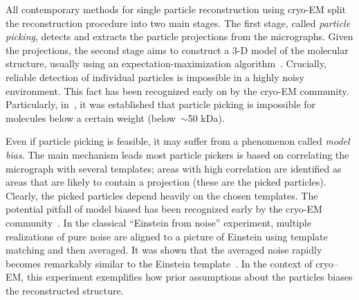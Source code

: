 \documentclass[12pt]{article}
\newcommand{\1}{\mathbf{1}}
\theoremstyle{plain}
\theoremstyle{definition}
\theoremstyle{remark}
\theoremstyle{plain}
\theoremstyle{remark}
\theoremstyle{plain}
\theoremstyle{plain}
\theoremstyle{plain}
\numberwithin{equation}{section}
\begin{document}
All contemporary methods for single particle reconstruction using cryo-EM  split the reconstruction procedure into two main  stages.
The first stage, called \emph{particle picking},  detects and extracts the particle projections from the micrographs. Given the projections, the second stage aims to construct a 3-D model of the molecular structure, usually using an expectation-maximization algorithm~\cite{scheres2012relion}. 
Crucially, reliable detection of individual particles is impossible in a highly noisy environment. This fact has been recognized early on by the cryo-EM community. 
Particularly, in~\cite{henderson1995limitations,glaeser1999electron}, it was established that particle picking is impossible for molecules below a certain weight (below~$\sim$50 kDa). 

Even if particle picking is feasible, it may suffer from a phenomenon called \emph{model bias}.
The main mechanism leads most particle pickers is based on correlating the micrograph with several templates; areas with high correlation are identified as areas that  are likely to contain a projection (these are the picked particles). 
Clearly, the picked particles depend heavily on the chosen templates.
The potential pitfall of model biased
has been recognized early by the cryo-EM community~\cite{shatsky2009method,vanheel1992correlation,henderson2013avoiding,vanheel2013finding}. In the classical ``Einstein from noise'' experiment, multiple realizations of pure noise are aligned to a picture of Einstein using template matching and then averaged. It was shown that the averaged noise rapidly becomes remarkably similar to the Einstein template~\cite{shatsky2009method}. In the context of cryo--EM, this experiment exemplifies how prior assumptions about the particles biases the reconstructed structure. %
\end{document}
